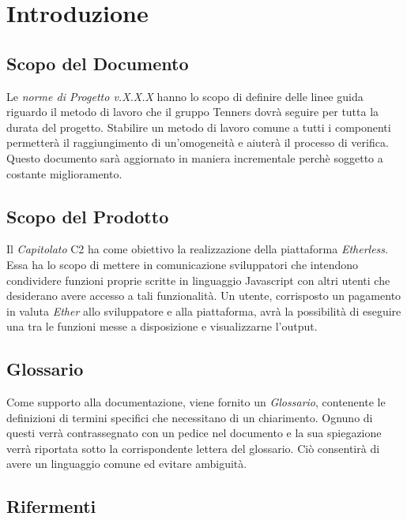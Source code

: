 \section{Introduzione}

\subsection{Scopo del Documento}
Le \textit{norme di Progetto v.X.X.X} hanno lo scopo di definire delle linee guida riguardo il metodo di lavoro che il gruppo Tenners dovrà seguire per tutta la durata del progetto. Stabilire un metodo di lavoro comune a tutti i componenti permetterà il raggiungimento di un'omogeneità e aiuterà il processo di verifica. Questo documento sar\`a aggiornato in maniera incrementale perchè soggetto a costante miglioramento.

\subsection{Scopo del Prodotto}
Il \textit{Capitolato\glo} C2 ha come obiettivo la realizzazione della piattaforma \textit{Etherless}. Essa ha lo scopo di mettere in comunicazione sviluppatori che intendono condividere funzioni proprie scritte in linguaggio Javascript con altri utenti che desiderano avere accesso a tali funzionalità. Un utente, corrisposto un pagamento in valuta \textit{Ether\glos} allo sviluppatore e alla piattaforma, avrà la possibilità di eseguire una tra le funzioni messe a disposizione e visualizzarne l'output. 


\subsection{Glossario}
Come supporto alla documentazione, viene fornito un \textit{Glossario}\docs,
contenente le definizioni di termini specifici che necessitano di un chiarimento.
Ognuno di questi verr\`a contrassegnato con un pedice \glo nel documento e la sua
spiegazione verr\`a riportata sotto la corrispondente lettera del glossario. Ci\`o
consentir\`a di avere un linguaggio comune ed evitare ambiguit\`a.

\subsection{Rifermenti}
